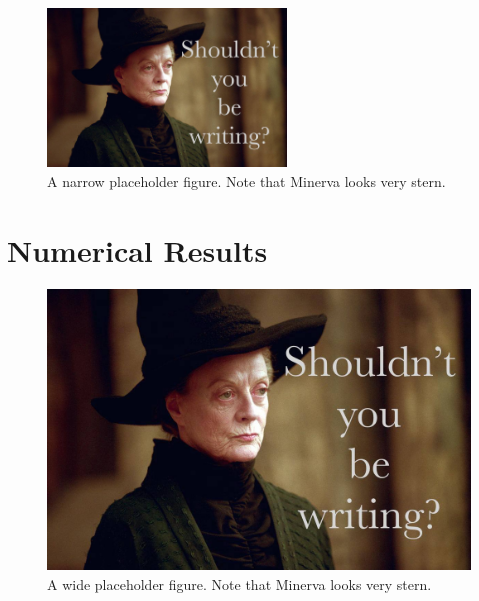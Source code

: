\documentclass[jgrga]{agutex}
\begin{document}
\begin{article}
\begin{figure}
    \label{fig_placeholder_narrow}
    \begin{center}
    \includegraphics[width=15pc]{figures/placeholder.jpg}
    \caption{
        A narrow placeholder figure. Note that Minerva looks very
        stern. 
    }
    \end{center}
\end{figure}

\lipsum[7]


\section{Numerical Results}

\lipsum[8-10]

\begin{figure}
    \label{fig_placeholder_wide}
    \begin{center}
    \includegraphics[width=\textwidth]{figures/placeholder.jpg}
    \caption{
        A wide placeholder figure. Note that Minerva looks very stern.
    }
    \end{center}
\end{figure}


\end{article}
\end{document}
